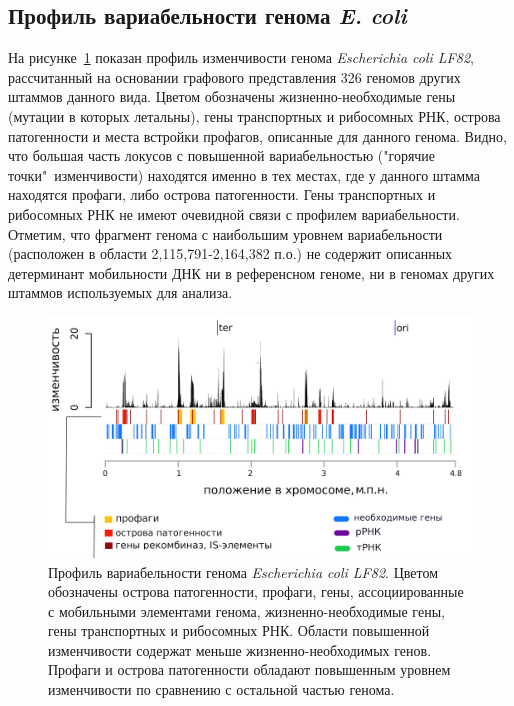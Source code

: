 \subsection{Профиль вариабельности генома \textit{E. coli}}
На рисунке~\ref{img:complexity_lf82} показан профиль изменчивости генома \textit{Escherichia coli LF82}, рассчитанный на основании графового представления 326 геномов других штаммов данного вида. Цветом обозначены жизненно-необходимые гены (мутации в которых летальны), гены транспортных и рибосомных РНК, острова патогенности и места встройки профагов, описанные для данного генома. Видно, что большая часть локусов с повышенной вариабельностью ("горячие точки"\ изменчивости) находятся именно в тех местах, где у данного штамма находятся профаги, либо острова патогенности. Гены транспортных и рибосомных РНК не имеют очевидной связи с профилем вариабельности. Отметим, что фрагмент генома с наибольшим уровнем вариабельности (расположен в области 2,115,791-2,164,382 п.о.) не содержит описанных детерминант мобильности ДНК ни в референсном геноме, ни в геномах других штаммов используемых для анализа. 

\begin{figure}[!ht] 
  \center
    \includegraphics[width=\textwidth]{Dissertation/images/complexity/figure5plus.png}
  \caption{Профиль вариабельности генома \textit{Escherichia coli LF82}. Цветом обозначены острова патогенности, профаги,  гены, ассоциированные с мобильными элементами генома, жизненно-необходимые гены, гены транспортных и рибосомных РНК. Области повышенной изменчивости содержат меньше жизненно-необходимых генов. Профаги и острова патогенности обладают повышенным уровнем изменчивости по сравнению с остальной частью генома.}
  \label{img:complexity_lf82} 
\end{figure}


